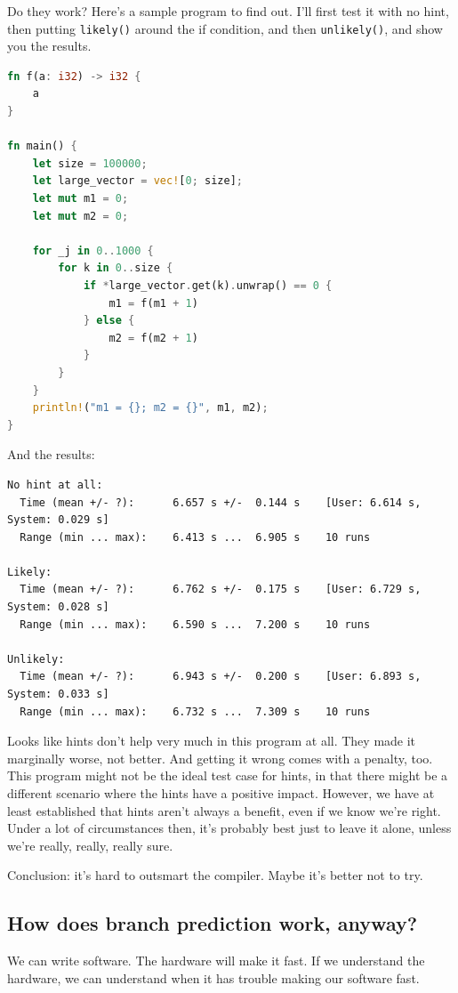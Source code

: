 \documentclass[a4paper]{report}
\begin{document}
Do they work? Here's a sample program to find out. I'll first test it with no hint, then putting \texttt{likely()} around the if condition, and then \texttt{unlikely()}, and show you the results.

\begin{lstlisting}[language=Rust]
fn f(a: i32) -> i32 {
    a
}

fn main() {
    let size = 100000;
    let large_vector = vec![0; size];
    let mut m1 = 0;
    let mut m2 = 0;

    for _j in 0..1000 {
        for k in 0..size {
            if *large_vector.get(k).unwrap() == 0 {
                m1 = f(m1 + 1)
            } else {
                m2 = f(m2 + 1)
            }
        }
    }
    println!("m1 = {}; m2 = {}", m1, m2);
}
\end{lstlisting}

And the results:
\begin{verbatim}
No hint at all:
  Time (mean +/- ?):      6.657 s +/-  0.144 s    [User: 6.614 s, System: 0.029 s]
  Range (min ... max):    6.413 s ...  6.905 s    10 runs
  
Likely:
  Time (mean +/- ?):      6.762 s +/-  0.175 s    [User: 6.729 s, System: 0.028 s]
  Range (min ... max):    6.590 s ...  7.200 s    10 runs

Unlikely:
  Time (mean +/- ?):      6.943 s +/-  0.200 s    [User: 6.893 s, System: 0.033 s]
  Range (min ... max):    6.732 s ...  7.309 s    10 runs
\end{verbatim}

Looks like hints don't help very much in this program at all. They made it marginally worse, not better. And getting it wrong comes with a penalty, too. This program might not be the ideal test case for hints, in that there might be a different scenario where the hints have a positive impact. However, we have at least established that hints aren't always a benefit, even if we know we're right. Under a lot of circumstances then, it's probably best just to leave it alone, unless we're really, really, really sure. 

Conclusion: it's hard to outsmart the compiler. Maybe it's better not to try.

\subsection*{How does branch prediction work, anyway?}
We can write software. The hardware will make it fast. If we understand the hardware, we can understand when it has trouble making our software fast.
\end{document}
